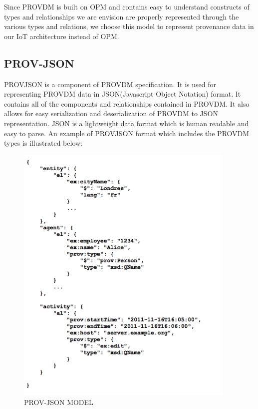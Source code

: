 Since PROV\-DM is built on OPM and contains easy to understand constructs of types and relationships we are envision are properly represented through the various types and relations, we choose this model to represent provenance data in our IoT architecture instead of OPM. 

\subsection{PROV-JSON}

PROV\-JSON is a component of PROV\-DM specification. It is used for representing PROV\-DM data in JSON(Javascript Object Notation) format. It contains all of the components and relationships contained in PROV\-DM. It also allows for easy serialization and deserialization of PROV\-DM to JSON representation. JSON is a lightweight data format which is human readable and easy to parse. An example of PROV\-JSON format which includes the PROV\-DM types is illustrated below:

\begin{figure}[h]
\begin{center}

\includegraphics[height=5in]{prov_json.png}
\end{center}
\caption{PROV-JSON MODEL}

\end{figure}




